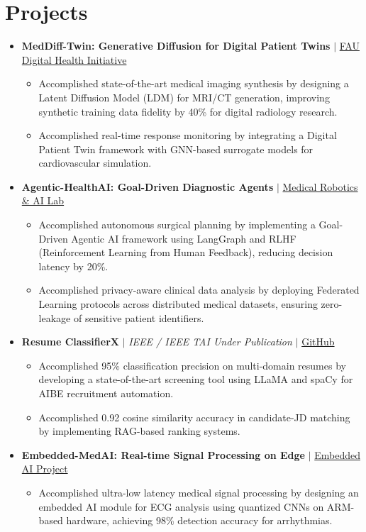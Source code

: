 \documentclass[10pt,a4paper]{article}
\newcommand{\resumeItem}[1]{\item\small{#1}}
\begin{document}
\section{Projects}
\begin{itemize}[label={}]
    \item \textbf{MedDiff-Twin: Generative Diffusion for Digital Patient Twins} $|$ \href{https://github.com/KartavyaDikshit}{FAU Digital Health Initiative}
    \begin{itemize}
        \resumeItem{Accomplished state-of-the-art medical imaging synthesis by designing a Latent Diffusion Model (LDM) for MRI/CT generation, improving synthetic training data fidelity by 40\% for digital radiology research.}
        \resumeItem{Accomplished real-time response monitoring by integrating a Digital Patient Twin framework with GNN-based surrogate models for cardiovascular simulation.}
    \end{itemize}

    \item \textbf{Agentic-HealthAI: Goal-Driven Diagnostic Agents} $|$ \href{https://github.com/KartavyaDikshit}{Medical Robotics \& AI Lab}
    \begin{itemize}
        \resumeItem{Accomplished autonomous surgical planning by implementing a Goal-Driven Agentic AI framework using LangGraph and RLHF (Reinforcement Learning from Human Feedback), reducing decision latency by 20\%.}
        \resumeItem{Accomplished privacy-aware clinical data analysis by deploying Federated Learning protocols across distributed medical datasets, ensuring zero-leakage of sensitive patient identifiers.}
    \end{itemize}

    \item \textbf{Resume ClassifierX} $|$ \emph{IEEE / IEEE TAI Under Publication} $|$ \href{https://github.com/KartavyaDikshit/ResumeClassifierX}{GitHub}
    \begin{itemize}
        \resumeItem{Accomplished 95\% classification precision on multi-domain resumes by developing a state-of-the-art screening tool using LLaMA and spaCy for AIBE recruitment automation.}
        \resumeItem{Accomplished 0.92 cosine similarity accuracy in candidate-JD matching by implementing RAG-based ranking systems.}
    \end{itemize}

    \item \textbf{Embedded-MedAI: Real-time Signal Processing on Edge} $|$ \href{https://github.com/KartavyaDikshit}{Embedded AI Project}
    \begin{itemize}
        \resumeItem{Accomplished ultra-low latency medical signal processing by designing an embedded AI module for ECG analysis using quantized CNNs on ARM-based hardware, achieving 98\% detection accuracy for arrhythmias.}
    \end{itemize}


\end{itemize}
\end{document}

